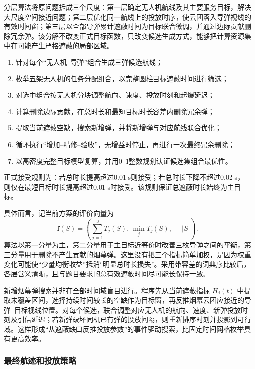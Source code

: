 \documentclass[12pt,a4paper]{ctexart}
\begin{document}
分层算法将原问题拆成三个尺度：第一层确定无人机航线及其主要服务目标，解决大尺度空间接近问题；第二层优化同一航线上的投放时序，使云团落入导弹视线的有效时间窗；第三层以全部导弹累计遮蔽时间为目标联合微调，并通过边际贡献删除冗余弹。该分解不改变正式目标函数，只改变候选生成方式，能够把计算资源集中在可能产生严格遮蔽的局部区域。

\begin{enumerate}[label=\arabic*)]
\item 针对每个“无人机--导弹”组合生成三弹候选航线；
\item 枚举五架无人机的任务分配组合，以完整圆柱目标遮蔽时间进行筛选；
\item 对选中组合按无人机分块调整航向、速度、投放时刻和起爆延迟；
\item 计算删除边际贡献，在总时长和最短目标时长容差内删除冗余弹；
\item 提取当前遮蔽空缺，搜索新增弹，并将新增弹与对应航线联合优化；
\item 循环执行“增加--精修--验收”，无增益时停止，再进行一次最终冗余删除；
\item 以高密度完整目标模型复算，并用0--1整数规划认证候选集组合最优性。
\end{enumerate}

正式接受规则为：若总时长提高超过0.01 s则接受；若总时长下降不超过0.02 s，则仅在最短目标时长提高超过0.01 s时接受。该规则保证总遮蔽时长始终为主目标。

具体而言，记当前方案的评价向量为
\begin{equation}
\bm f(S)=\left(\sum_{j=1}^{3}T_j(S),\ \min_jT_j(S),\ -|S|\right).
\end{equation}
算法以第一分量为主，第二分量用于主目标近等价时改善三枚导弹之间的平衡，第三分量用于删除不产生贡献的烟幕弹。这里没有把三个指标简单加权，是因为权重变化可能使“少量均衡收益”抵消“明显总时长损失”。采用带容差的词典序比较后，各层含义清晰，且与题目要求的总有效遮蔽时间尽可能长保持一致。

新增烟幕弹搜索并非在全部时间域盲目进行。程序先从当前遮蔽指标 $H_j(t)$ 中提取未覆盖区间，选择持续时间较长的空缺作为目标窗，再反推烟幕云团应接近的导弹--目标视线位置。对每个候选，联合调整对应无人机的航向、速度、新弹投放时刻及引信延迟；若新弹破坏同机已有弹的投放间隔，则重新排序时刻并投影到可行域。这样形成“从遮蔽缺口反推投放参数”的事件驱动搜索，比固定时间网格枚举具有更高效率。

\subsubsection{最终航迹和投放策略}
\end{document}
